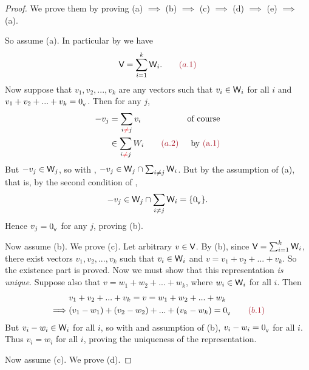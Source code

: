 \begin{proof}
We prove them by proving (a) \(\implies\) (b) \(\implies\) (c) \(\implies\) (d) \(\implies\) (e) \(\implies\) (a).

So assume (a).
In particular by  we have
\[
    \V = \sum_{i = 1}^k \W_i. \quad \quad \MAROON{(a.1)}
\]
Now suppose that \(v_1, v_2, ..., v_k\) are any vectors such that \(v_i \in \textsf{W}_i\) for all \(i\) and \(v_1 + v_2 + ... + v_k = 0_{_{\textsf{V}}}\).
Then for any \(j\),
\begin{align*}
    -v_j & = \sum_{i \RED{\ne} j} v_i & \text{of course} \\
         & \in \sum_{i \RED{\ne} j} W_i \quad \quad \MAROON{(a.2)} & \text{by \MAROON{(a.1)}}
\end{align*}
But \(-v_j \in \textsf{W}_j\), so with , \(-v_j \in \textsf{W}_j \cap \sum_{i \ne j} \textsf{W}_i\).
But by the assumption of (a), that is, by the second condition of ,
\[
    -v_j \in \textsf{W}_j \cap \sum_{i \ne j} \textsf{W}_i = \{ 0_{_{\textsf{V}}} \}.
\]
Hence \(v_j = 0_{_{\textsf{V}}}\) for any \(j\), proving (b).

Now assume (b). We prove (c).
Let arbitrary \(v \in \textsf{V}\).
By (b), since \(\textsf{V} = \sum_{i = 1}^k \textsf{W}_i\), there exist vectors \(v_1, v_2, ..., v_k\) such that \(v_i \in \textsf{W}_i\) and \(v = v_1 + v_2 + ... + v_k\).
So the existence part is proved.
Now we must show that this representation \emph{is unique}. Suppose also that \(v = w_1 + w_2 + ... + w_k\), where \(w_i \in \textsf{W}_i\) for all \(i\).
Then
\begin{align*}
             & v_1 + v_2 + ... + v_k = v = w_1 + w_2 + ... + w_k \\
    \implies & (v_1 - w_1) + (v_2 - w_2) + ... + (v_k - w_k) = \OV \quad \quad \MAROON{(b.1)}
\end{align*}
But \(v_i - w_i \in \textsf{W}_i\) for all \(i\), so with  and assumption of (b), \(v_i - w_i = 0_{_{\textsf{V}}}\) for all \(i\).
Thus \(v_i = w_i\) for all \(i\), proving the uniqueness of the representation.

Now assume (c). We prove (d).


\end{proof}
